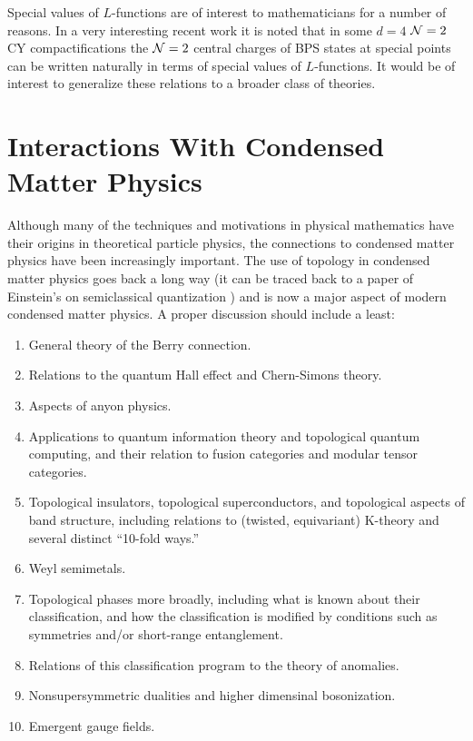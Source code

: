 \documentclass[12pt]{article}
\begin{document}
Special values of $L$-functions are of interest to mathematicians 
for a number of reasons. In a very interesting recent work \cite{Bonisch:2022mgw} it is noted that in some  $d=4$ ${\cal N}=2$ CY compactifications 
the ${\cal N}=2$ central charges of BPS states at special points can be written 
naturally in terms of  special values of $L$-functions. It would be 
of interest to generalize these relations to a broader class of theories.  


 



\section{Interactions With Condensed Matter Physics}\label{sec:CondMat}

Although many of the techniques and motivations in physical 
mathematics have their origins in theoretical particle physics, 
the connections to condensed matter physics have been increasingly 
important. The use of topology in condensed matter physics goes 
back a long way (it can be traced back to a paper of Einstein's 
on semiclassical quantization \cite{EinsteinChaos,DougStone}) 
and is now a major aspect of modern condensed matter physics. A proper discussion should include a least: 

\begin{enumerate} 

\item General theory of the Berry connection. 

\item Relations to the quantum Hall effect and Chern-Simons theory. 

\item Aspects of anyon physics. 

\item Applications to quantum information theory and 
topological quantum computing, and their relation to 
fusion categories and modular tensor categories. 

\item Topological insulators, topological superconductors, and topological aspects of band structure, 
including relations to  (twisted, equivariant) K-theory and several distinct 
  ``10-fold ways.'' 

\item Weyl semimetals. 
  
  
\item Topological phases more broadly, including what 
is known about their classification, and how the classification 
is modified by conditions such as symmetries and/or 
short-range entanglement. 

\item Relations of this classification program to 
the theory of anomalies. 

\item Nonsupersymmetric dualities and higher dimensinal bosonization. 

\item Emergent gauge fields. 

\end{enumerate} 
\end{document}
